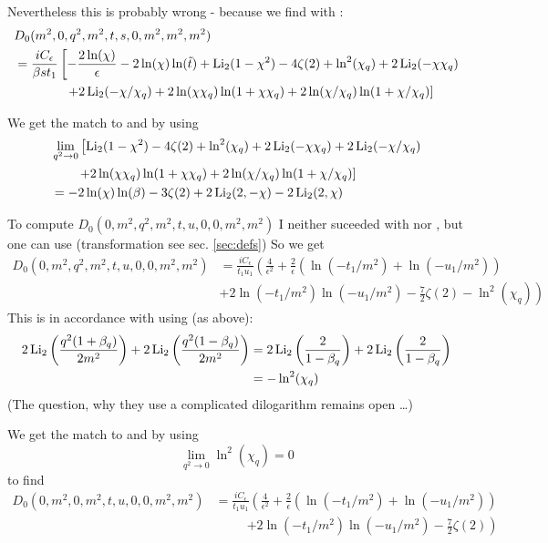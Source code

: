 Nevertheless this is probably wrong - because we find with \cite[Box 16]{Ellis:2007qk}:
\begin{align}
&D_0(m^2,0,q^2,m^2,t,s,0,m^2,m^2,m^2)\nonumber\\
 &=\frac{i C_\epsilon}{\beta s t_1}\left[-\frac{2\ln(\chi)}{\epsilon} -2\ln(\chi)\ln(\tilde t)+\operatorname{\text{Li}_2}(1-\chi^2)-4\zeta(2)+\ln^2(\chi_q) + 2\operatorname{\text{Li}_2}(-\chi\chi_q)\right.\nonumber\\
 &\hspace{40pt}\left. +2\operatorname{\text{Li}_2}(-\chi/\chi_q)+2\ln(\chi\chi_q)\ln(1+\chi\chi_q)+2\ln(\chi/\chi_q)\ln(1+\chi/\chi_q)\right]
\end{align}

We get the match to \cite{Bojak:2000eu} and \cite{PhysRevD.40.54} by using
\begin{align}
&\lim_{q^2\rightarrow 0}\left[\operatorname{\text{Li}_2}(1-\chi^2)-4\zeta(2)+\ln^2(\chi_q) + 2\operatorname{\text{Li}_2}(-\chi\chi_q)+2\operatorname{\text{Li}_2}(-\chi/\chi_q)\right.\nonumber\\
&\hspace{20pt}\left. +2\ln(\chi\chi_q)\ln(1+\chi\chi_q)+2\ln(\chi/\chi_q)\ln(1+\chi/\chi_q)\right]\nonumber\\
&=-2\ln(\chi)\ln(\beta)-3\zeta(2)+2\operatorname{\text{Li}_2}(2,-\chi)-2\operatorname{\text{Li}_2}(2,\chi)
\end{align}

To compute $D_0(0,m^2,q^2,m^2,t,u,0,0,m^2,m^2)$ I neither suceeded with \cite{Bojak:2000eu} nor \cite{Denner:1991qq}, but one can use \cite[Box 11]{Ellis:2007qk} (transformation see sec. \ref{sec:defs})
So we get
\begin{align}
D_0(0,m^2,q^2,m^2,t,u,0,0,m^2,m^2) &= \frac{iC_\epsilon}{t_1u_1}\left(\frac 4 {\epsilon^2}+\frac 2 {\epsilon}\left(\ln(-t_1/m^2)+\ln(-u_1/m^2)\right)\right.\nonumber\\
 &\left. + 2\ln(-t_1/m^2)\ln(-u_1/m^2) - \frac 7 2\zeta(2) - \ln^2(\chi_q) \right)
\end{align}
This is in accordance with \cite[eq. (A.4)]{Laenen1993162} using \cite{Zagier2007} (as above):
\begin{align}
2\operatorname{\text{Li}_2}\left(\frac{q^2(1+\beta_q)}{2m^2}\right)+2\operatorname{\text{Li}_2}\left(\frac{q^2(1-\beta_q)}{2m^2}\right) &= 2\operatorname{\text{Li}_2}\left(\frac{2}{1-\beta_q}\right)+2\operatorname{\text{Li}_2}\left(\frac{2}{1-\beta_q}\right)\\
 &=-\ln^2(\chi_q)
\end{align}
(The question, why they use a complicated dilogarithm remains open \ldots)

We get the match to \cite{Bojak:2000eu} and \cite{PhysRevD.40.54} by using
\begin{equation}
\lim_{q^2\rightarrow 0} \ln^2(\chi_q) = 0
\end{equation}
to find 
\begin{align}
D_0(0,m^2,0,m^2,t,u,0,0,m^2,m^2) &= \frac{iC_\epsilon}{t_1u_1}\left(\frac 4 {\epsilon^2}+\frac 2 {\epsilon}\left(\ln(-t_1/m^2)+\ln(-u_1/m^2)\right)\right.\nonumber\\
 &\hspace{30pt}\left. + 2\ln(-t_1/m^2)\ln(-u_1/m^2) - \frac 7 2\zeta(2)\right)
\end{align}

